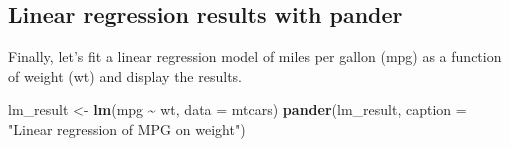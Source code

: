 \documentclass[
]{book}
\newenvironment{Shaded}{\begin{snugshade}}{\end{snugshade}}
\newcommand{\AttributeTok}[1]{\textcolor[rgb]{0.13,0.29,0.53}{#1}}
\newcommand{\FunctionTok}[1]{\textcolor[rgb]{0.13,0.29,0.53}{\textbf{#1}}}
\newcommand{\NormalTok}[1]{#1}
\newcommand{\OtherTok}[1]{\textcolor[rgb]{0.56,0.35,0.01}{#1}}
\newcommand{\SpecialCharTok}[1]{\textcolor[rgb]{0.81,0.36,0.00}{\textbf{#1}}}
\newcommand{\StringTok}[1]{\textcolor[rgb]{0.31,0.60,0.02}{#1}}
\begin{document}
\hypertarget{linear-regression-results-with-pander}{%
\subsection{Linear regression results with pander}\label{linear-regression-results-with-pander}}

Finally, let's fit a linear regression model of miles per gallon (mpg) as a function of weight (wt) and display the results.

\begin{Shaded}
\begin{Highlighting}[]
\NormalTok{lm\_result }\OtherTok{\textless{}{-}} \FunctionTok{lm}\NormalTok{(mpg }\SpecialCharTok{\textasciitilde{}}\NormalTok{ wt, }\AttributeTok{data =}\NormalTok{ mtcars)}
\FunctionTok{pander}\NormalTok{(lm\_result, }\AttributeTok{caption =} \StringTok{"Linear regression of MPG on weight"}\NormalTok{)}
\end{Highlighting}
\end{Shaded}


  
\end{document}
